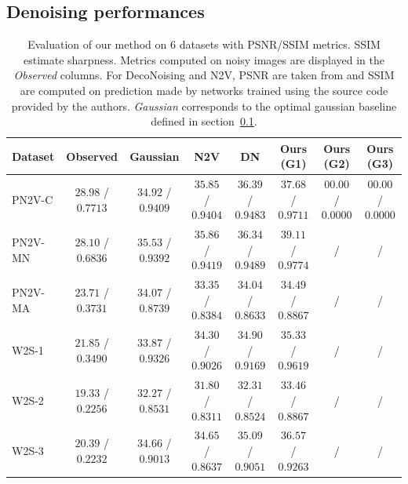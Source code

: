 \documentclass{article}
\begin{document}
\subsection{Denoising performances}
\label{sec:perf}
\begin{table}[t]
\caption{Evaluation of our method on 6 datasets with PSNR/SSIM metrics. SSIM estimate sharpness. Metrics computed on noisy images are displayed in the \textit{Observed} columns. For DecoNoising and N2V, PSNR are taken from \cite{goncharova2020} and SSIM are computed on prediction made by networks trained using the source code provided by the authors\footnotemark. \textit{Gaussian} corresponds to the optimal gaussian baseline defined in section~\ref{sec:perf}.}
\label{table:results}
\vskip 0.15in
\begin{center}
\begin{small}
\begin{sc}
\begin{tabular}{l@{\hskip 7.5pt}c@{\hskip 7.5pt}c@{\hskip 7.5pt}c@{\hskip 7.5pt}c@{\hskip 7.5pt}c@{\hskip 7.5pt}c@{\hskip 7.5pt}c}
\toprule
Dataset & Observed & Gaussian & N2V & DN & Ours (G1) & Ours (G2) & Ours (G3) \\
\midrule
PN2V-C & $28.98$ / $0.7713$ & $34.92$ / $0.9409$ & $35.85$ / $0.9404$ & $36.39$ / $0.9483$ & $37.68$ / $0.9711$ & $00.00$ / $0.0000$ & $00.00$ / $0.0000$ \\
PN2V-MN & $28.10$ / $0.6836$ & $35.53$ / $0.9392$ & $35.86$ / $0.9419$ & $36.34$ / $0.9489$ & $39.11$ / $0.9774$ & / & /\\
PN2V-MA & $23.71$ / $0.3731$ & $34.07$ / $0.8739$ & $33.35$ / $0.8384$ & $34.04$ / $0.8633$ & $34.49$ / $0.8867$ & / & /\\
W2S-1 & $21.85$ / $0.3490$ & $33.87$ / $0.9326$ & $34.30$ / $0.9026$ & $34.90$ / $0.9169$ & $35.33$ / $0.9619$ & / & / \\
W2S-2 & $19.33$ / $0.2256$ & $32.27$ / $0.8531$ & $31.80$ / $0.8311$ & $32.31$ / $0.8524$ & $33.46$ / $0.8867$ & / & / \\
W2S-3 & $20.39$ / $0.2232$ & $34.66$ / $0.9013$ & $34.65$ / $0.8637$ & $35.09$ / $0.9051$ & $36.57$ / $0.9263$ & / & / \\
\bottomrule
\end{tabular}
\end{sc}
\end{small}
\end{center}
\vskip -0.1in
\end{table}
\end{document}
